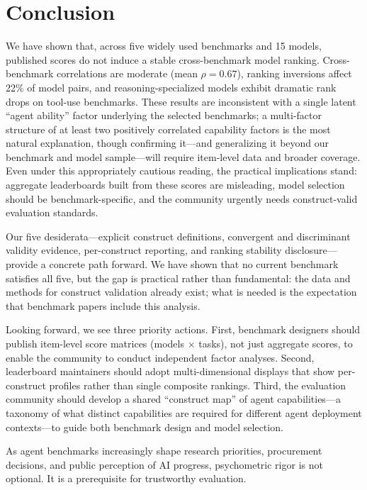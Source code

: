 \documentclass[sigconf]{acmart}
\begin{document}
\section{Conclusion}
We have shown that, across five widely used benchmarks and 15 models, published scores do not induce a stable cross-benchmark model ranking. Cross-benchmark correlations are moderate (mean $\rho = 0.67$), ranking inversions affect 22\% of model pairs, and reasoning-specialized models exhibit dramatic rank drops on tool-use benchmarks. These results are inconsistent with a single latent ``agent ability'' factor underlying the selected benchmarks; a multi-factor structure of at least two positively correlated capability factors is the most natural explanation, though confirming it---and generalizing it beyond our benchmark and model sample---will require item-level data and broader coverage. Even under this appropriately cautious reading, the practical implications stand: aggregate leaderboards built from these scores are misleading, model selection should be benchmark-specific, and the community urgently needs construct-valid evaluation standards.

Our five desiderata---explicit construct definitions, convergent and discriminant validity evidence, per-construct reporting, and ranking stability disclosure---provide a concrete path forward. We have shown that no current benchmark satisfies all five, but the gap is practical rather than fundamental: the data and methods for construct validation already exist; what is needed is the expectation that benchmark papers include this analysis.

Looking forward, we see three priority actions. First, benchmark designers should publish item-level score matrices (models $\times$ tasks), not just aggregate scores, to enable the community to conduct independent factor analyses. Second, leaderboard maintainers should adopt multi-dimensional displays that show per-construct profiles rather than single composite rankings. Third, the evaluation community should develop a shared ``construct map'' of agent capabilities---a taxonomy of what distinct capabilities are required for different agent deployment contexts---to guide both benchmark design and model selection.

As agent benchmarks increasingly shape research priorities, procurement decisions, and public perception of AI progress, psychometric rigor is not optional. It is a prerequisite for trustworthy evaluation.



\end{document}
